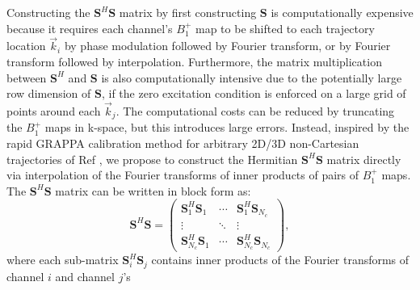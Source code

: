 
\par Constructing the $\bm{S}^{H}\bm{S}$ matrix by first constructing $\bm{S}$ is computationally expensive 
because it requires each channel's $B_1^+$ map to be shifted to each trajectory location $\vec{k}_i$
by phase modulation followed by Fourier transform, or by Fourier transform followed by interpolation. 
Furthermore, 
the matrix multiplication between $\bm{S}^{H}$ and $\bm{S}$ is also computationally intensive due to the potentially 
large row dimension of $\bm{S}$, if the zero excitation condition is enforced on a large grid of points around each $\vec{k}_j$.
The computational costs can be reduced by truncating the $B_1^+$ maps in k-space, 
but this introduces large errors. 
Instead, inspired by the rapid GRAPPA calibration method for arbitrary 2D/3D non-Cartesian trajectories of Ref \cite{luo2019grappa}, 
we propose to construct the Hermitian $\bm{S}^{H}\bm{S}$ matrix directly via interpolation of the Fourier transforms
of inner products of pairs of $B_1^+$ maps. 
The $\bm{S}^H\bm{S}$ matrix can be written in block form as:
\begin{equation}\label{eq:SHS_blocks}
\bm{S}^{H}\bm{S} = 
\begin{pmatrix}
\bm{S}_1^{H}\bm{S}_1 & \cdots & \bm{S}_1^{H}\bm{S}_{N_c} \\
\vdots  &  \ddots & \vdots  \\
\bm{S}_{N_c}^{H}\bm{S}_1 & \cdots & \bm{S}_{N_c}^{H}\bm{S}_{N_c} 
\end{pmatrix}, 
\end{equation}
where each sub-matrix $\bm{S}_i^H\bm{S}_j$ contains inner products of the Fourier transforms of channel $i$ and channel $j$'s 
